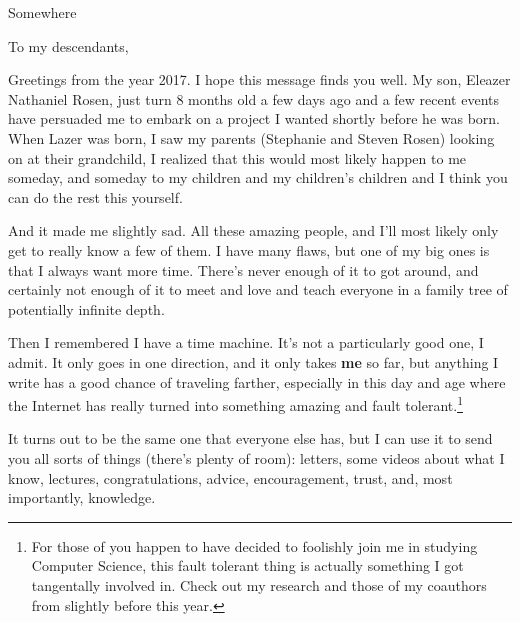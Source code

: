 \documentclass[]{letter}
\begin{document}
\date{Insert here from history}
\begin{letter}{Somewhere }

\address{Rosen Manor}

\opening{To my descendants,}


Greetings from the year 2017.
I hope this message finds you well.
My son, Eleazer Nathaniel Rosen, just turn 8 months old a few days ago and a few recent events have persuaded me to embark on a project I wanted shortly before he was born.
When Lazer was born, I saw my parents (Stephanie and Steven Rosen) looking on at their grandchild, I realized that this would most likely happen to me someday, and someday to my children and my children's children and I think you can do the rest this yourself.

And it made me slightly sad.
All these amazing people, and I'll most likely only get to really know a few of them.
I have many flaws, but one of my big ones is that I always want more time.
There's never enough of it to got around, and certainly not enough of it to meet and love and teach everyone in a family tree of potentially infinite depth.


Then I remembered I have a time machine.
It's not a particularly good one, I admit. 
It only goes in one direction, and it only takes \textbf{me} so far, but anything I write has a good chance of traveling farther, especially in this day and age where the Internet has really turned into something amazing and fault tolerant.\footnote{For those of you happen to have decided to foolishly join me in studying Computer Science, this fault tolerant thing is actually something I got tangentally involved in.  Check out my research and those of my coauthors from slightly before this year. }

It turns out to be the same one that everyone else has, but I can use it to send you all sorts of things (there's plenty of room):
letters, some videos about what I know, lectures, congratulations, advice, encouragement, trust, and, most importantly, knowledge.

%
%


\end{letter}
\end{document}
